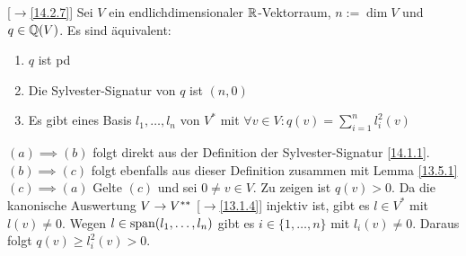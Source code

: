 \documentclass[../../main.tex]{subfiles}
\begin{document}
\begin{sat}\mbox{}[$\to$\ref{14.2.7}]
\label{14.2.12}
Sei $V$ ein endlichdimensionaler $\mathbb R$-Vektorraum, $n:=\dim V$ und $q\in \mathbb Q(V)$. Es sind äquivalent:
\begin{enumerate}[\normalfont(a)]
\item $q$ ist pd
\item Die Sylvester-Signatur von $q$ ist $(n,0)$
\item Es gibt eines Basis $l_1,\ldots ,l_n$ von $V^*$ mit $\forall v\in V: q(v)=\sum_{i=1}^n l_i^2(v)$
\end{enumerate}
\end{sat}
\begin{cproof}
\underline{$(a)\implies (b)$} folgt direkt aus der Definition der Sylvester-Signatur \ref{14.1.1}.\\

\noindent\underline{$(b)\implies (c)$} folgt ebenfalls aus dieser Definition zusammen mit Lemma \ref{13.5.1}\\

\noindent \underline{$(c)\implies (a)$} Gelte $(c)$ und sei $0\neq v\in V$. Zu zeigen ist $q(v)>0$. Da die kanonische Auswertung $V\to V^{**}$ [$\to$\ref{13.1.4}] injektiv ist, gibt es $l\in V^*$ mit $l(v)\neq 0$. Wegen $l\in\operatorname{span}(l_1,\ldots ,l_n)$ gibt es $i\in\{1,\ldots ,n\}$ mit $l_i(v)\neq 0$. Daraus folgt $q(v)\ge l_i^2(v)>0$.
\end{cproof}
\end{document}
